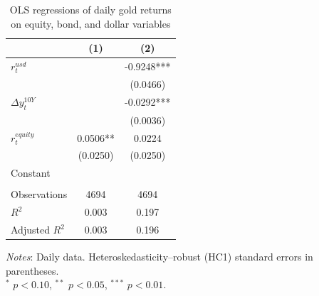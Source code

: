 \begin{table}[H]
\centering
\caption{OLS regressions of daily gold returns on equity, bond, and dollar variables}
\label{tab:ols_gold_equity}
\begin{tabular}{lcc}
\toprule
 & (1) & (2) \\
\midrule
$r^{usd}_t$ &  & -0.9248*** \\
 &  & (0.0466) \\
$\Delta y^{10Y}_t$ &  & -0.0292*** \\
 &  & (0.0036) \\
$r^{equity}_t$ & 0.0506** & 0.0224 \\
 & (0.0250) & (0.0250) \\
Constant &  &  \\
 &  &  \\
Observations & 4694 & 4694 \\
$R^2$ & 0.003 & 0.197 \\
Adjusted $R^2$ & 0.003 & 0.196 \\
\bottomrule
\end{tabular}

\vspace{0.2cm}
\begin{minipage}{0.9\textwidth}
\footnotesize
\textit{Notes}: Daily data. Heteroskedasticity--robust (HC1) standard errors in parentheses.\\
$^*$ $p<0.10$, $^{**}$ $p<0.05$, $^{***}$ $p<0.01$.
\end{minipage}
\end{table}

